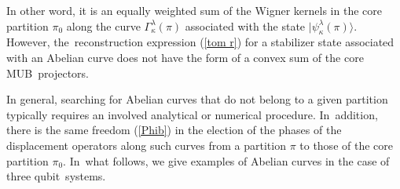 \documentclass[quantumrep,article,accept,pdftex,moreauthors]{Definitions/mdpi}
\begin{document}
In other word, it is an equally weighted sum of the Wigner kernels in the core partition
$\pi_{0}$ along the curve $\Gamma_{\kappa }^{\lambda}(\pi)$ associated with the
state $|\psi_{\kappa}^{\lambda }(\pi)\rangle$. However, the~reconstruction
expression (\ref{tom r}) for a stabilizer state associated with an Abelian curve
does not have the form of a convex sum of the core MUB~projectors.

In general, searching for Abelian curves that do not belong to a given partition
typically requires an involved analytical or numerical procedure.  In~addition,
there is the same freedom (\ref{Phib}) in the election of the phases of the
displacement operators along such curves from a partition $\pi$ to  those
of the core partition $\pi_{0}$. In~what follows, we give examples of Abelian
curves in the case of three qubit~systems.
\end{document}
